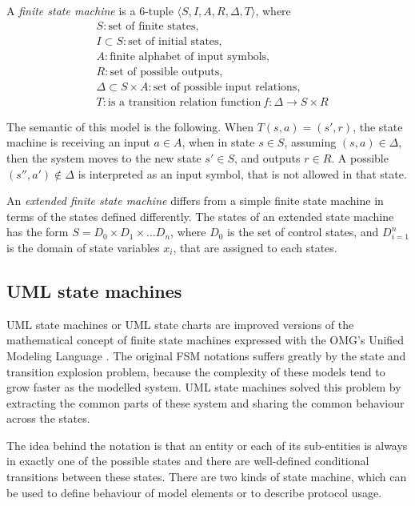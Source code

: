 A \textit{finite state machine} is a 6-tuple $\langle S, I, A, R, \Delta, T\rangle$, where
\begin{align*}
& S: \text{set of finite states},\\
& I \subset S: \text{set of initial states},\\
& A: \text{finite alphabet of input symbols},\\
& R: \text{set of possible outputs},\\
& \Delta \subset S \times A: \text{set of possible input relations},\\
& T: \text{is a transition relation function}\ f: \Delta \rightarrow S \times R
\end{align*}

The semantic of this model is the following. When $T(s, a) = (s', r)$, the state machine is receiving an input $a \in A$, when in state $s \in S$, assuming $(s,a) \in \Delta$, then the system moves to the new state $s' \in S$, and outputs $r \in R$. A possible $(s'', a') \notin \Delta$ is interpreted as an input symbol, that is not allowed in that state.

An \textit{extended finite state machine} differs from a simple finite state machine in terms of the states defined differently. The states of an extended state machine has the form $S = D_0 \times D_1 \times \dots D_n$, where $D_0$ is the set of control states, and $D_{i=1}^n$ is the domain of state variables $x_i$, that are assigned to each states.


\subsection{UML state machines}
\label{sub:umlstatemachine}

UML state machines or UML state charts are improved versions of the mathematical concept of finite state machines expressed with the OMG's Unified Modeling Language \cite{omguml}. The original FSM notations suffers greatly by the state and transition explosion problem, because the complexity of these models tend to grow faster as the modelled system. UML state machines solved this problem by extracting the common parts of these system and sharing the common behaviour across the states.

The idea behind the notation is that an entity or each of its sub-entities is always in exactly one of the possible states and there are well-defined conditional transitions between these states. There are two kinds of state machine, which can be used to define behaviour of model elements or to describe protocol usage.

